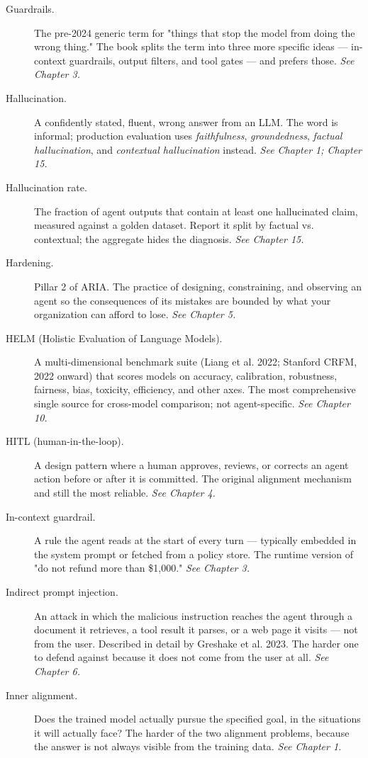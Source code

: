 \begin{description}
  \item[Guardrails.] The pre-2024 generic term for "things that stop the model from doing the wrong thing." The book splits the term into three more specific ideas — in-context guardrails, output filters, and tool gates — and prefers those. \textit{See Chapter 3.}
  \item[Hallucination.] A confidently stated, fluent, wrong answer from an LLM. The word is informal; production evaluation uses \textit{faithfulness}, \textit{groundedness}, \textit{factual hallucination}, and \textit{contextual hallucination} instead. \textit{See Chapter 1; Chapter 15.}
  \item[Hallucination rate.] The fraction of agent outputs that contain at least one hallucinated claim, measured against a golden dataset. Report it split by factual vs. contextual; the aggregate hides the diagnosis. \textit{See Chapter 15.}
  \item[Hardening.] Pillar 2 of ARIA. The practice of designing, constraining, and observing an agent so the consequences of its mistakes are bounded by what your organization can afford to lose. \textit{See Chapter 5.}
  \item[HELM (Holistic Evaluation of Language Models).] A multi-dimensional benchmark suite (Liang et al. 2022; Stanford CRFM, 2022 onward) that scores models on accuracy, calibration, robustness, fairness, bias, toxicity, efficiency, and other axes. The most comprehensive single source for cross-model comparison; not agent-specific. \textit{See Chapter 10.}
  \item[HITL (human-in-the-loop).] A design pattern where a human approves, reviews, or corrects an agent action before or after it is committed. The original alignment mechanism and still the most reliable. \textit{See Chapter 4.}
  \item[In-context guardrail.] A rule the agent reads at the start of every turn — typically embedded in the system prompt or fetched from a policy store. The runtime version of "do not refund more than \$1,000." \textit{See Chapter 3.}
  \item[Indirect prompt injection.] An attack in which the malicious instruction reaches the agent through a document it retrieves, a tool result it parses, or a web page it visits — not from the user. Described in detail by Greshake et al. 2023. The harder one to defend against because it does not come from the user at all. \textit{See Chapter 6.}
  \item[Inner alignment.] Does the trained model actually pursue the specified goal, in the situations it will actually face? The harder of the two alignment problems, because the answer is not always visible from the training data. \textit{See Chapter 1.}

\end{description}
